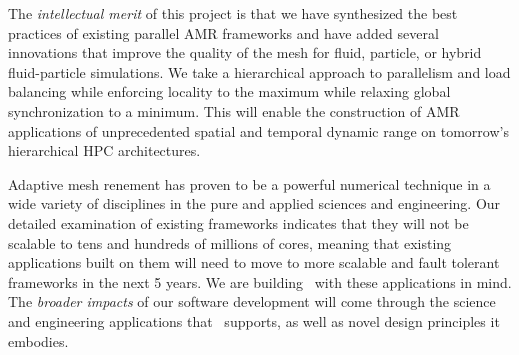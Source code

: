 \documentclass[11pt,letterpaper]{article}
\begin{document}


The \textit{intellectual merit} of this project is that we have
synthesized the best practices of existing parallel AMR frameworks and
have added several innovations that improve the quality of the mesh
for fluid, particle, or hybrid fluid-particle simulations. We take a
hierarchical approach to parallelism and load balancing while
enforcing locality to the maximum while relaxing global
synchronization to a minimum. This will enable the construction of AMR
applications of unprecedented spatial and temporal dynamic range on
tomorrow's hierarchical HPC architectures.







Adaptive mesh renement has proven to be a powerful numerical technique
in a wide variety of disciplines in the pure and applied sciences and
engineering. Our detailed examination of existing frameworks indicates
that they will not be scalable to tens and hundreds of millions of
cores, meaning that existing applications built on them will need to
move to more scalable and fault tolerant frameworks in the next 5
years. We are building \cello\ with these applications in mind.  The
\textit{broader impacts} of our software development will come through
the science and engineering applications that \cello\ supports, as well
as novel design principles it embodies.



\end{document}
